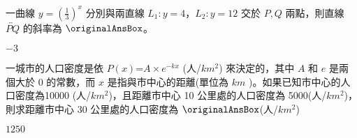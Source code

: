 \begin{QUESTIONS}
\begin{QUESTION}
\end{QUESTION}
\begin{QUESTION}
    \begin{QBODY}
         一曲線 $y={{\left( \frac{1}{3} \right)}^{x}}$ 分別與兩直線 ${{L}_{1}}:y=4$，${{L}_{2}}:y=12$ 交於 $P,Q$ 兩點，則直線$\overleftrightarrow{PQ}$ 的斜率為 $\originalAnsBox $。
    \end{QBODY}
    \begin{QFROMS}
    \end{QFROMS}
    \begin{QTAGS} \end{QTAGS}
    \begin{QANS}
        $-3$
    \end{QANS}
    \begin{QSOL}
    \end{QSOL}
    \begin{QEMPTYSPACE}
    \end{QEMPTYSPACE}
\end{QUESTION}
\begin{QUESTION}
    \begin{QBODY}
        一城市的人口密度是依 $P\left( x \right)\text{=}A\times {{e}^{-kx}}$ (人/$k{{m}^{2}}$) 來決定的，其中 $A$ 和 $e$ 是兩個大於 0 的常數，而 $x$ 是指與市中心的距離(單位為 $km$ )。如果已知市中心的人口密度為10000 (人/$k{{m}^{2}}$)，且距離市中心 10 公里處的人口密度為 5000(人/$k{{m}^{2}}$)，則求距離市中心 30 公里處的人口密度為 $\originalAnsBox$(人/$k{{m}^{2}}$)
    \end{QBODY}
    \begin{QFROMS}
    \end{QFROMS}
    \begin{QTAGS} \end{QTAGS}
    \begin{QANS}
        $1250$
    \end{QANS}
    \begin{QSOL}
    \end{QSOL}
    \begin{QEMPTYSPACE}
    \end{QEMPTYSPACE}
\end{QUESTION}
\end{QUESTIONS}
    


